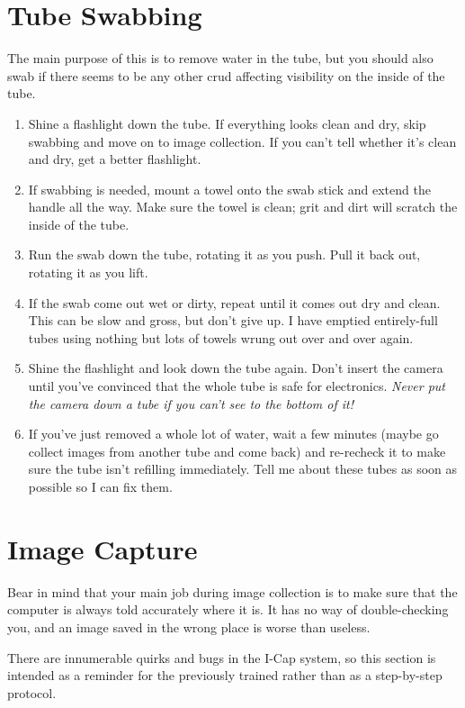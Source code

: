 \documentclass[11pt]{article}
\begin{document}
\section{Tube Swabbing}
	The main purpose of this is to remove water in the tube, but you should also  swab if there seems to be any other crud affecting visibility on the inside of the tube.
	\begin{enumerate}
		\item{Shine a flashlight down the tube. If everything looks clean and dry, skip swabbing and move on to image collection. If you can't tell whether it's clean and dry, get a better flashlight.}
		\item{If swabbing is needed, mount a towel onto the swab stick and extend the handle all the way. Make sure the towel is clean; grit and dirt will scratch the inside of the tube.}
		\item{Run the swab down the tube, rotating it as you push. Pull it back out, rotating it as you lift.}
		\item{If the swab come out  wet or dirty, repeat until it comes out dry and clean. This can be slow and gross, but don't give up. I have emptied entirely-full tubes using nothing but lots of towels wrung out over and over again.}
		\item{Shine the flashlight and look down the tube again. Don't insert the camera until you've convinced that the whole tube is safe for electronics. \textit{Never put the camera down a tube if you can't see to the bottom of it!}}
		\item{If you've just removed a whole lot of water, wait a few minutes (maybe go collect images from another tube and come back) and re-recheck it to make sure the tube isn't refilling immediately. Tell me about these tubes as soon as possible so I can fix them.}
\end{enumerate}
	
\section{Image Capture}
	Bear in mind that your main job during image collection is to make sure that the computer is always told accurately where it is. It has no way of double-checking you, and an image saved in the wrong place is worse than useless.
	
	There are innumerable quirks and bugs in the I-Cap system, so this section is intended as a reminder for the previously trained rather than as a step-by-step protocol.
	
\end{document}
